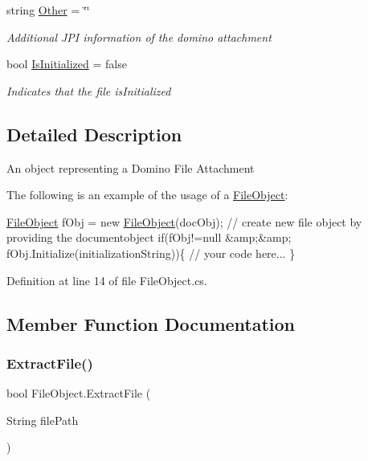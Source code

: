 \begin{DoxyCompactItemize}
string \mbox{\hyperlink{class_file_object_ab91b5eca56a04784f8d0187247e1280c}{Other}} = \char`\"{}\char`\"{}
\begin{DoxyCompactList}\small\item\em Additional J\+PI information of the domino attachment \end{DoxyCompactList}\item 
bool \mbox{\hyperlink{class_file_object_a36ff6c07d0662885402bfe7d98cf2988}{Is\+Initialized}} = false
\begin{DoxyCompactList}\small\item\em Indicates that the file is\+Initialized \end{DoxyCompactList}\end{DoxyCompactItemize}


\subsection{Detailed Description}
An object representing a Domino File Attachment 

The following is an example of the usage of a {\ttfamily \mbox{\hyperlink{class_file_object}{File\+Object}}}\+: 
\begin{DoxyCode}
\mbox{\hyperlink{class_file_object}{FileObject}} fObj = \textcolor{keyword}{new} \mbox{\hyperlink{class_file_object}{FileObject}}(docObj); \textcolor{comment}{// create new file object by providing the
       documentobject}
\textcolor{keywordflow}{if}(fObj!=null &amp;&amp; fObj.Initialize(initializationString))\{ 
     \textcolor{comment}{// your code here... }
\}
\end{DoxyCode}
 

Definition at line 14 of file File\+Object.\+cs.



\subsection{Member Function Documentation}
\mbox{\label{class_file_object_ae21fac09c5ab2f9fac96a3f084cb9ddc}} 
\subsubsection{\texorpdfstring{Extract\+File()}{ExtractFile()}}
{\footnotesize\ttfamily bool File\+Object.\+Extract\+File (\begin{DoxyParamCaption}\item[{String}]{file\+Path }\end{DoxyParamCaption})}



